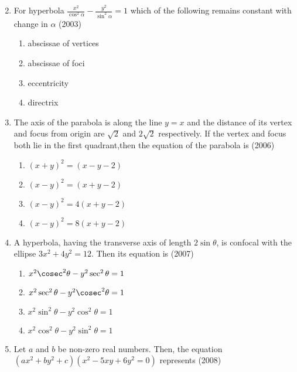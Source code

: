 \begin{enumerate}[label=\thesubsection.\arabic*.,ref=\thesubsection.\theenumi]
\begin{multicols}{4}
\end{multicols}
\item For hyperbola $\frac{x^{2}}{\cos^{2}\alpha}-\frac{y^{2}}{\sin^{2}\alpha}=1$ which of the following remains constant with change in $\alpha$
\hfill{(2003)}
\begin{multicols}{2}
\begin{enumerate}
    \item abscissae of vertices
    \item abscissae of foci
    \item eccentricity
    \item directrix
\end{enumerate}
\end{multicols}
\item The axis of the parabola is along the line $y=x$ and the distance of its vertex and focus from  origin are $\sqrt2$ and $2\sqrt2$  respectively. If the vertex and focus both lie in the first quadrant,then the equation of the parabola is \hfill{(2006)}
\begin{multicols}{2}
\begin{enumerate}
    \item $(x+y)^{2}=(x-y-2)$
    \item $(x-y)^{2}=(x+y-2)$
    \item $(x-y)^{2}=4(x+y-2)$
    \item $(x-y)^{2}=8(x+y-2)$
\end{enumerate}
\end{multicols}
\item A hyperbola, having the transverse axis of length $2\sin\theta$, is confocal with the ellipse $3x^{2}+4y^{2}=12$. Then its equation is \hfill{(2007)}
	\begin{multicols}{2}
\begin{enumerate}
    \item ${x^{2}\cosec^{2}\theta}-{y^{2}\sec^{2}\theta=1}$
    \item $x^{2}\sec^{2}\theta-y^{2}\cosec^{2}\theta=1$
    \item $x^{2}\sin^{2}\theta-y^{2}\cos^{2}\theta=1$
    \item $x^{2}\cos^{2}\theta-y^{2}\sin^{2}\theta=1$
\end{enumerate}\end{multicols}
\item Let $a$ and $b$ be non-zero real numbers. Then, the equation $(ax^{2}+by^{2}+c)(x^{2}-5xy+6y^{2}=0)$ represents \hfill{(2008)}
\begin{enumerate}

\end{enumerate}
\end{enumerate}
